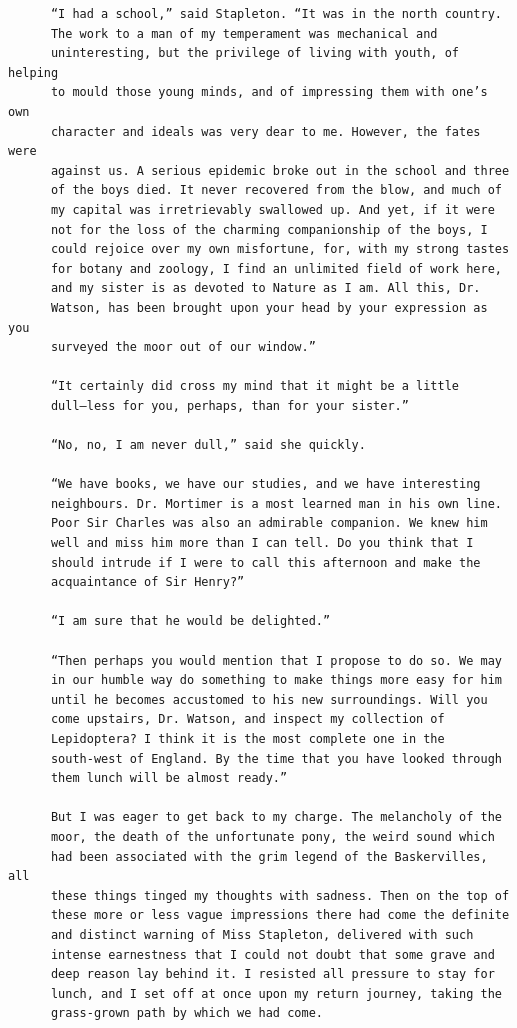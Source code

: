 \documentclass{article}
\begin{document}
\begin{verbatim}
      “I had a school,” said Stapleton. “It was in the north country.
      The work to a man of my temperament was mechanical and
      uninteresting, but the privilege of living with youth, of helping
      to mould those young minds, and of impressing them with one’s own
      character and ideals was very dear to me. However, the fates were
      against us. A serious epidemic broke out in the school and three
      of the boys died. It never recovered from the blow, and much of
      my capital was irretrievably swallowed up. And yet, if it were
      not for the loss of the charming companionship of the boys, I
      could rejoice over my own misfortune, for, with my strong tastes
      for botany and zoology, I find an unlimited field of work here,
      and my sister is as devoted to Nature as I am. All this, Dr.
      Watson, has been brought upon your head by your expression as you
      surveyed the moor out of our window.”

      “It certainly did cross my mind that it might be a little
      dull—less for you, perhaps, than for your sister.”

      “No, no, I am never dull,” said she quickly.

      “We have books, we have our studies, and we have interesting
      neighbours. Dr. Mortimer is a most learned man in his own line.
      Poor Sir Charles was also an admirable companion. We knew him
      well and miss him more than I can tell. Do you think that I
      should intrude if I were to call this afternoon and make the
      acquaintance of Sir Henry?”

      “I am sure that he would be delighted.”

      “Then perhaps you would mention that I propose to do so. We may
      in our humble way do something to make things more easy for him
      until he becomes accustomed to his new surroundings. Will you
      come upstairs, Dr. Watson, and inspect my collection of
      Lepidoptera? I think it is the most complete one in the
      south-west of England. By the time that you have looked through
      them lunch will be almost ready.”

      But I was eager to get back to my charge. The melancholy of the
      moor, the death of the unfortunate pony, the weird sound which
      had been associated with the grim legend of the Baskervilles, all
      these things tinged my thoughts with sadness. Then on the top of
      these more or less vague impressions there had come the definite
      and distinct warning of Miss Stapleton, delivered with such
      intense earnestness that I could not doubt that some grave and
      deep reason lay behind it. I resisted all pressure to stay for
      lunch, and I set off at once upon my return journey, taking the
      grass-grown path by which we had come.


\end{verbatim}
\end{document}
